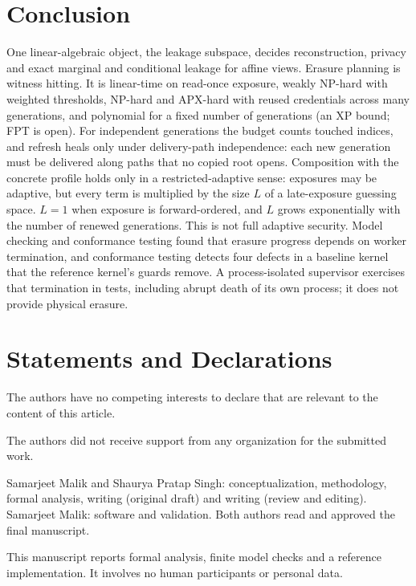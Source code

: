 \documentclass[pdflatex,sn-mathphys-num]{sn-jnl}%
\theoremstyle{plain}
\theoremstyle{definition}
\begin{document}
\section{Conclusion}
One linear-algebraic object, the leakage subspace, decides reconstruction, privacy and exact marginal and conditional leakage for affine views. Erasure planning is witness hitting. It is linear-time on read-once exposure, weakly NP-hard with weighted thresholds, NP-hard and APX-hard with reused credentials across many generations, and polynomial for a fixed number of generations (an XP bound; FPT is open). For independent generations the budget counts touched indices, and refresh heals only under delivery-path independence: each new generation must be delivered along paths that no copied root opens. Composition with the concrete profile holds only in a restricted-adaptive sense: exposures may be adaptive, but every term is multiplied by the size $L$ of a late-exposure guessing space. $L=1$ when exposure is forward-ordered, and $L$ grows exponentially with the number of renewed generations. This is not full adaptive security. Model checking and conformance testing found that erasure progress depends on worker termination, and conformance testing detects four defects in a baseline kernel that the reference kernel's guards remove. A process-isolated supervisor exercises that termination in tests, including abrupt death of its own process; it does not provide physical erasure.


\backmatter
\section*{Statements and Declarations}

The authors have no competing interests to declare that are relevant to the content of this article.

The authors did not receive support from any organization for the submitted work.

Samarjeet Malik and Shaurya Pratap Singh: conceptualization, methodology, formal analysis, writing (original draft) and writing (review and editing). Samarjeet Malik: software and validation. Both authors read and approved the final manuscript.

This manuscript reports formal analysis, finite model checks and a reference implementation. It involves no human participants or personal data.
\end{document}
